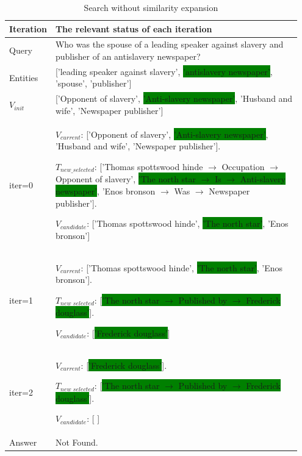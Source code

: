 \documentclass{article}
\theoremstyle{plain}
\theoremstyle{definition}
\theoremstyle{remark}
\begin{document}
\begin{table}[htb]
  \centering
  \caption{Search without similarity expansion}
  \label{tab:search_without_sim}
  \begin{tabular}{p{0.1\linewidth}|p{0.85\linewidth}}
    \toprule
    Iteration & The relevant status of each iteration \\ \hline
    Query  & Who was the spouse of a leading speaker against slavery and publisher of an antislavery newspaper?  \\ 
    \hline
    Entities  & ['leading speaker against slavery', \colorbox{green}{'antislavery newspaper'}, 'spouse', 'publisher']  \\ 
    \hline
    $V_{init}$  & ['Opponent of slavery', \colorbox{green}{'Anti-slavery newspaper'}, 'Husband and wife', 'Newspaper publisher']  \\ 
    \hline
    iter=0  & $V_{current}$: ['Opponent of slavery', \colorbox{green}{'Anti-slavery newspaper'}, 'Husband and wife', 'Newspaper publisher']. \par$T_{new\_selected}$: ['Thomas spottswood hinde $\rightarrow$ Occupation $\rightarrow$ Opponent of slavery', \colorbox{green}{'The north star $\rightarrow$ Is $\rightarrow$ Anti-slavery newspaper'}, 'Enos bronson $\rightarrow$ Was $\rightarrow$ Newspaper publisher']. \par$V_{candidate}$: ['Thomas spottswood hinde', \colorbox{green}{'The north star'}, 'Enos bronson']  \\ 
    \hline
    iter=1  & $V_{current}$: ['Thomas spottswood hinde', \colorbox{green}{'The north star'}, 'Enos bronson']. \par$T_{new\_selected}$: [\colorbox{green}{'The north star $\rightarrow$ Published by $\rightarrow$ Frederick douglass'}]. \par$V_{candidate}$: [\colorbox{green}{'Frederick douglass'}]  \\ 
    \hline
    iter=2  & $V_{current}$: [\colorbox{green}{'Frederick douglass'}]. \par$T_{new\_selected}$: [\colorbox{green}{'The north star $\rightarrow$ Published by $\rightarrow$ Frederick douglass'}]. \par$V_{candidate}$: [ ]\\
    \hline
    Answer  & Not Found.\\
    \bottomrule
  \end{tabular}
\end{table}
\end{document}
